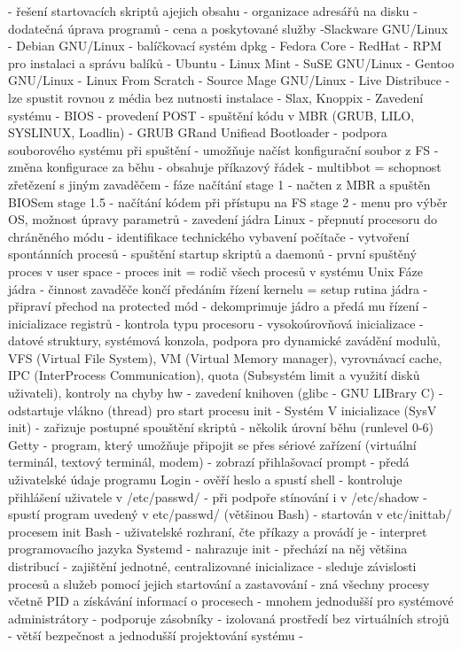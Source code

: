         - řešení startovacích skriptů ajejich obsahu
        - organizace adresářů na disku
        - dodatečná úprava programů
        - cena a poskytované služby
    -Slackware GNU/Linux
    - Debian GNU/Linux
        - balíčkovací systém dpkg
    - Fedora Core
        - RedHat
        - RPM pro instalaci a správu balíků
    - Ubuntu
    - Linux Mint
    - SuSE GNU/Linux
    - Gentoo GNU/Linux
    - Linux From Scratch
    - Source Mage GNU/Linux
    - Live Distribuce
        -lze spustit rovnou z média bez nutnosti instalace
        - Slax, Knoppix
- Zavedení systému
    - BIOS - provedení POST
    - spuštění kódu v MBR (GRUB, LILO, SYSLINUX, Loadlin)
        - GRUB GRand Unifiead Bootloader
            - podpora souborového systému při spuštění
            - umožňuje načíst konfigurační soubor z FS
                - změna konfigurace za běhu
            - obsahuje příkazový řádek
            - multibbot = schopnost zřetězení s jiným zavaděčem
            - fáze načítání
                stage 1 - načten z MBR a spuštěn BIOSem
                stage 1.5 - načítání kódem při přístupu na FS
                stage 2 - menu pro výběr OS, možnost úpravy parametrů
    - zavedení jádra Linux
        - přepnutí procesoru do chráněného módu
        - identifikace technického vybavení počítače
        - vytvoření spontánních procesů
    - spuštění startup skriptů a daemonů
        - první spuštěný proces v user space
        - proces init = rodič všech procesů v systému Unix
Fáze jádra
- činnost zavaděče končí předáním řízení kernelu = setup rutina jádra
    - připraví přechod na protected mód
    - dekomprimuje jádro a předá mu řízení
- inicializace registrů
- kontrola typu procesoru
- vysokoúrovňová inicializace
    - datové struktury, systémová konzola, podpora pro dynamické zavádění modulů, VFS (Virtual File System), VM (Virtual Memory manager), vyrovnávací cache, IPC (InterProcess Communication), quota (Subsystém limit a využití disků uživateli), kontroly na chyby hw
- zavedení knihoven (glibc - GNU LIBrary C)
- odstartuje vlákno (thread) pro start procesu init
    - Systém V inicializace (SysV init)
    - zařizuje postupné spouštění skriptů
    - několik úrovní běhu (runlevel 0-6)
Getty
- program, který umožňuje připojit se přes sériové zařízení (virtuální terminál, textový terminál, modem)
- zobrazí přihlašovací prompt - předá uživatelské údaje programu Login
    - ověří heslo a spustí shell
        - kontroluje přihlášení uživatele v /etc/passwd/
            - při podpoře stínování i v /etc/shadow
        - spustí program uvedený v etc/passwd/ (většinou Bash)
- startován v etc/inittab/ procesem init
Bash
- uživatelské rozhraní, čte příkazy a provádí je
- interpret programovacího jazyka
Systemd
- nahrazuje init
- přechází na něj většina distribucí
- zajištění jednotné, centralizované inicializace
- sleduje závislosti procesů a služeb pomocí jejich startování a zastavování
- zná všechny procesy včetně PID a získávání informací o procesech
    - mnohem jednodušší pro systémové administrátory
- podporuje zásobníky - izolovaná prostředí bez virtuálních strojů
    - větší bezpečnost a jednodušší projektování systému
- 
        
    


        
    
            
